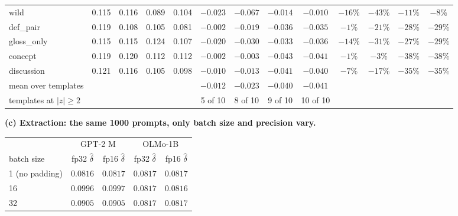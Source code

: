 \begin{table}[H]
\begin{tabular}{lcccc|cccc|cccc}
wild & 0.115 & 0.116 & 0.089 & 0.104 & $-0.023$\rlap{$^*$} & $-0.067$\rlap{$^*$} & $-0.014$ & $-0.010$\rlap{$^*$} & $-16\%$ & $-43\%$ & $-11\%$ & $-8\%$ \\
def\_pair & 0.119 & 0.108 & 0.105 & 0.081 & $-0.002$ & $-0.019$\rlap{$^*$} & $-0.036$\rlap{$^*$} & $-0.035$\rlap{$^*$} & $-1\%$ & $-21\%$ & $-28\%$ & $-29\%$ \\
gloss\_only & 0.115 & 0.115 & 0.124 & 0.107 & $-0.020$\rlap{$^*$} & $-0.030$\rlap{$^*$} & $-0.033$\rlap{$^*$} & $-0.036$\rlap{$^*$} & $-14\%$ & $-31\%$ & $-27\%$ & $-29\%$ \\
concept & 0.119 & 0.120 & 0.112 & 0.112 & $-0.002$ & $-0.003$ & $-0.043$\rlap{$^*$} & $-0.041$\rlap{$^*$} & $-1\%$ & $-3\%$ & $-38\%$ & $-38\%$ \\
discussion & 0.121 & 0.116 & 0.105 & 0.098 & $-0.010$ & $-0.013$\rlap{$^*$} & $-0.041$\rlap{$^*$} & $-0.040$\rlap{$^*$} & $-7\%$ & $-17\%$ & $-35\%$ & $-35\%$ \\
\midrule mean over templates & & & & & $-0.012$ & $-0.023$ & $-0.040$ & $-0.041$ &  &  &  &  \\
templates at $|z|\ge2$ & & & & & 5 of 10 & 8 of 10 & 9 of 10 & 10 of 10 &  &  &  &  \\
\bottomrule
\end{tabular}
\par\vspace{5pt}
\endgroup
\begingroup
\noindent\textbf{(c) Extraction: the same 1000 prompts, only batch size and precision vary.}\par\vspace{1.5pt}
\footnotesize
\setlength{\tabcolsep}{4pt}
\begin{tabular}{lcc|cc}
\toprule
& \multicolumn{2}{c|}{GPT-2 M} & \multicolumn{2}{c}{OLMo-1B} \\
batch size & fp32 $\hat\delta$ & fp16 $\hat\delta$ & fp32 $\hat\delta$ & fp16 $\hat\delta$ \\
\midrule
1 (no padding) & $0.0816$ & $0.0817$ & $0.0817$ & $0.0817$ \\
16 & $0.0996$ & $0.0997$ & $0.0817$ & $0.0816$ \\
32 & $0.0905$ & $0.0905$ & $0.0817$ & $0.0817$ \\
\bottomrule
\end{tabular}
\par\vspace{5pt}
\endgroup

\end{table}
